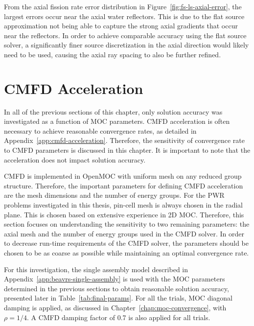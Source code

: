 From the axial fission rate error distribution in Figure~\ref{fig:fs-ls-axial-error}, the largest errors occur near the axial water reflectors. This is due to the flat source approximation not being able to capture the strong axial gradients that occur near the reflectors. In order to achieve comparable accuracy using the flat source solver, a significantly finer source discretization in the axial direction would likely need to be used, causing the axial ray spacing to also be further refined. 

\section{CMFD Acceleration}
\label{sec:cmfd-convergence-params}

In all of the previous sections of this chapter, only solution accuracy was investigated as a function of \ac{MOC} parameters. \ac{CMFD} acceleration is often necessary to achieve reasonable convergence rates, as detailed in Appendix~\ref{app:cmfd-acceleration}. Therefore, the sensitivity of convergence rate to \ac{CMFD} parameters is discussed in this chapter. It is important to note that the acceleration does not impact solution accuracy.

\ac{CMFD} is implemented in OpenMOC with uniform mesh on any reduced group structure. Therefore, the important parameters for defining \ac{CMFD} acceleration are the mesh dimensions and the number of energy groups. For the \ac{PWR} problems investigated in this thesis, pin-cell mesh is always chosen in the radial plane. This is chosen based on extensive experience in 2D \ac{MOC}. Therefore, this section focuses on understanding the sensitivity to two remaining parameters: the axial mesh and the number of energy groups used in the \ac{CMFD} solver. In order to decrease run-time requirements of the \ac{CMFD} solver, the parameters should be chosen to be as coarse as possible while maintaining an optimal convergence rate.

For this investigation, the single assembly model described in Appendix~\ref{app:beavrs-single-assembly} is used with the \ac{MOC} parameters determined in the previous sections to obtain reasonable solution accuracy, presented later in Table~\ref{tab:final-params}. For all the trials, \ac{MOC} diagonal damping is applied, as discussed in Chapter~\ref{chap:moc-convergence}, with $\rho = 1/4$. A \ac{CMFD} damping factor of 0.7 is also applied for all trials.

